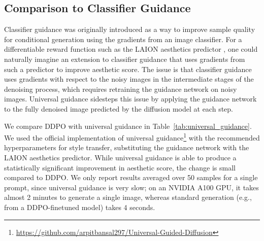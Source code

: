 \begin{appendices}
\section{Comparison to Classifier Guidance}
Classifier guidance \citep{dhariwal2021diffusion} was originally introduced as a way to improve sample quality for conditional generation using the gradients from an image classifier. For a differentiable reward function such as the LAION aesthetics predictor \citep{schuhmann2022laion}, one could naturally imagine an extension to classifier guidance that uses gradients from such a predictor to improve aesthetic score. The issue is that classifier guidance uses gradients with respect to the noisy images in the intermediate stages of the denoising process, which requires retraining the guidance network on noisy images. Universal guidance \citep{bansal2023universal} sidesteps this issue by applying the guidance network to the fully denoised image predicted by the diffusion model at each step.

We compare DDPO with universal guidance in Table~\ref{tab:universal_guidance}. We used the official implementation of universal guidance\footnote{\url{https://github.com/arpitbansal297/Universal-Guided-Diffusion}} with the recommended hyperparameters for style transfer, substituting the guidance network with the LAION aesthetics predictor. While universal guidance is able to produce a statistically significant improvement in aesthetic score, the change is small compared to DDPO. We only report results averaged over 50 samples for a single prompt, since universal guidance is very slow; on an NVIDIA A100 GPU, it takes almost 2 minutes to generate a single image, whereas standard generation (e.g., from a DDPO-finetuned model) takes 4 seconds.


\end{appendices}

